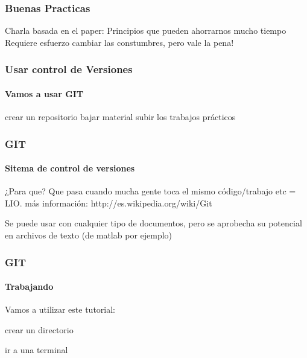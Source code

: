 \documentclass[Berlin]{beamer}
\begin{document}
  \begin{frame}
    \frametitle{Buenas Practicas}
      Charla basada en el paper: 
      Principios que pueden ahorrarnos mucho tiempo
      Requiere esfuerzo cambiar las constumbres, pero vale la pena!

  \end{frame}


  \begin{frame}
    \frametitle{Usar control de Versiones}
    \framesubtitle{Vamos a usar GIT}
    crear un repositorio
    bajar material
    subir los trabajos prácticos

  \end{frame}

  \begin{frame}
    \frametitle{GIT}
    \framesubtitle{Sitema de control de versiones}
    ¿Para que? 
    Que pasa cuando mucha gente toca el mismo código/trabajo etc = LIO.
    más información:    http://es.wikipedia.org/wiki/Git
    
    Se puede usar con cualquier tipo de documentos, 
    pero se aprobecha su potencial en archivos de texto (de matlab por ejemplo)

  \end{frame}

  \begin{frame}
    \frametitle{GIT}
    \framesubtitle{Trabajando}
  
      Vamos a utilizar este tutorial:    %

      crear un  directorio
      
      ir a una terminal 
%      

  \end{frame}
\end{document}
